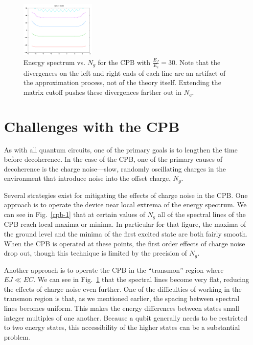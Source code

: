 \documentclass[twocolumn]{revtex4}
\newcommand{\figwidth}{0.33\textwidth}
\begin{document}
\begin{figure}
  \includegraphics[width=\figwidth]{CPB-30.png}
  \caption{Energy spectrum vs. $N_g$ for the CPB with
    $\frac{E_J}{E_c}=30$. Note that the divergences on the left and
    right ends of each line are an artifact of the approximation
    process, not of the theory itself. Extending the matrix cutoff
    pushes these divergences farther out in $N_g$.}
  \label{cpb-30}
\end{figure}

\section{Challenges with the CPB}
As with all quantum circuits, one of the primary goals is to lengthen
the time before decoherence. In the case of the CPB, one of the
primary causes of decoherence is the charge noise---slow, randomly
oscillating charges in the environment that introduce noise into the
offset charge, $N_g$.

Several strategies exist for mitigating the effects of charge noise in
the CPB. One approach is to operate the device near local extrema of
the energy spectrum. We can see in Fig.~\ref{cpb-1} that at certain
values of $N_g$ all of the spectral lines of the CPB reach local
maxima or minima. In particular for that figure, the maxima of the
ground level and the minima of the first excited state are both fairly
smooth. When the CPB is operated at these points, the first order
effects of charge noise drop out, though this technique is limited by
the precision of $N_g$.

Another approach is to operate the CPB in the ``transmon'' region
where $EJ\ll EC$. We can see in Fig.~\ref{cpb-30} that the spectral
lines become very flat, reducing the effects of charge noise even
further. One of the difficulties of working in the transmon region is
that, as we mentioned earlier, the spacing between spectral lines
becomes uniform. This makes the energy differences between states
small integer multiples of one another. Because a qubit generally
needs to be restricted to two energy states, this accessibility of the
higher states can be a substantial problem.
\end{document}

